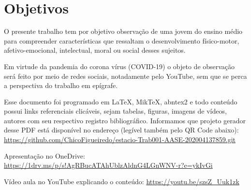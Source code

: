 \chapter{Objetivos}

O presente trabalho tem por objetivo observação de uma jovem do ensino médio para compreender características  que ressaltam o  desenvolvimento físico-motor, afetivo-emocional, intelectual, moral ou social desses sujeitos.

Em virtude da pandemia do corona vírus (COVID-19) o objeto de observação será feito por meio de redes sociais, notadamente pelo YouTube, sem que se perca a perspectiva do trabalho em epígrafe.




Esse documento foi programado em \LaTeX, MikTeX, abntex2 e todo conteúdo possui links referenciais clicáveis, sejam tabelas, figuras, imagens de vídeos, autores com seu respectivo registro bibliográfico.
Informamos que projeto gerador desse PDF está disponível no endereço (legível também pelo QR Code abaixo): \\
\url{https://github.com/ChicoFigueiredo/estacio-Trab001-AASE-202004137859.git} \\
\begin{center}
    \href{https://github.com/ChicoFigueiredo/estacio-Trab001-AASE-202004137859.git}{
    }
\end{center}


Apresentação no OneDrive: \url{https://1drv.ms/p/s!AgRBucATAhUblzAldnG4LGnWNV-r?e=ykIvGi} \\
\begin{center}
    \href{https://1drv.ms/p/s!AgRBucATAhUblzAldnG4LGnWNV-r?e=ykIvGi}{
    }
\end{center}




Vídeo aula no YouTube explicando o conteúdo: \url{https://youtu.be/szsZ_Uuk1zk} \\
\begin{center}
    \href{https://youtu.be/szsZ_Uuk1zk}{
    }
\end{center}
